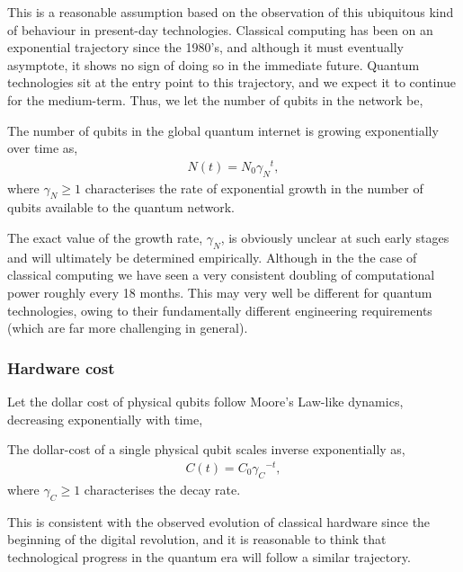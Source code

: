 This is a reasonable assumption based on the observation of this ubiquitous kind of behaviour in present-day technologies. Classical computing has been on an exponential trajectory since the 1980's, and although it must eventually asymptote, it shows no sign of doing so in the immediate future. Quantum technologies sit at the entry point to this trajectory, and we expect it to continue for the medium-term. Thus, we let the number of qubits in the network be,
\begin{postulate}\label{post:net_growth}
The number of qubits in the global quantum internet is growing exponentially over time as,
\begin{align}
	N(t) = N_0 {\gamma_N}^{t},
\end{align}
where \mbox{$\gamma_N\geq 1$} characterises the rate of exponential growth in the number of qubits available to the quantum network.
\end{postulate}

The exact value of the growth rate, $\gamma_N$, is obviously unclear at such early stages and will ultimately be determined empirically. Although in the the case of classical computing we have seen a very consistent doubling of computational power roughly every 18 months. This may very well be different for quantum technologies, owing to their fundamentally different engineering requirements (which are far more challenging in general).

%
%

\subsubsection{Hardware cost} 

Let the dollar cost of physical qubits follow Moore's Law-like dynamics, decreasing exponentially with time,
\begin{postulate}\label{post:hardware_cost}
The dollar-cost of a single physical qubit scales inverse exponentially as,
\begin{align}
	C(t) = C_0 {\gamma_C}^{-t},
\end{align}
where \mbox{$\gamma_C\geq 1$} characterises the decay rate.
\end{postulate}

This is consistent with the observed evolution of classical hardware since the beginning of the digital revolution, and it is reasonable to think that technological progress in the quantum era will follow a similar trajectory.

